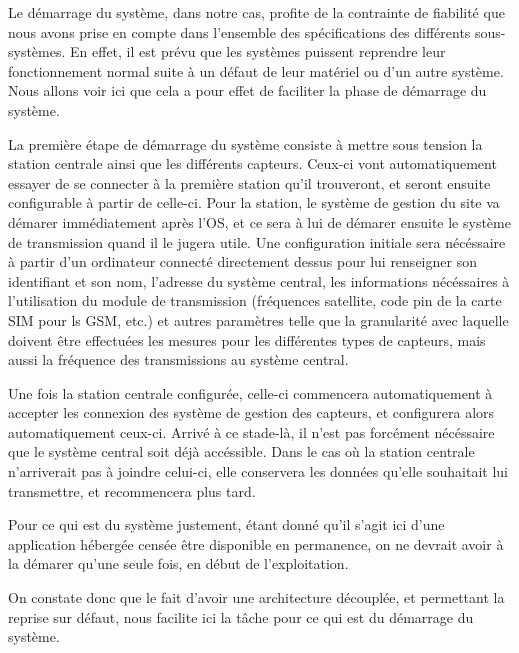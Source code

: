 Le démarrage du système, dans notre cas, profite de la contrainte de fiabilité que nous avons prise en compte dans l'ensemble des spécifications des différents sous-systèmes. En effet, il est prévu que les systèmes puissent reprendre leur fonctionnement normal suite à un défaut de leur matériel ou d'un autre système. Nous allons voir ici que cela a pour effet de faciliter la phase de démarrage du système.

La première étape de démarrage du système consiste à mettre sous tension la station centrale ainsi que les différents capteurs. Ceux-ci vont automatiquement essayer de se connecter à la première station qu'il trouveront, et seront ensuite configurable à partir de celle-ci. Pour la station, le système de gestion du site va démarer immédiatement après l'OS, et ce sera à lui de démarer ensuite le système de transmission quand il le jugera utile. Une configuration initiale sera nécéssaire à partir d'un ordinateur connecté directement dessus pour lui renseigner son identifiant et son nom, l'adresse du système central, les informations nécéssaires à l'utilisation du module de transmission (fréquences satellite, code pin de la carte SIM pour ls GSM, etc.) et autres paramètres telle que la granularité avec laquelle doivent être effectuées les mesures pour les différentes types de capteurs, mais aussi la fréquence des transmissions au système central.

Une fois la station centrale configurée, celle-ci commencera automatiquement à accepter les connexion des système de gestion des capteurs, et configurera alors automatiquement ceux-ci. Arrivé à ce stade-là, il n'est pas forcément nécéssaire que le système central soit déjà accéssible. Dans le cas où la station centrale n'arriverait pas à joindre celui-ci, elle conservera les données qu'elle souhaitait lui transmettre, et recommencera plus tard.

Pour ce qui est du système justement, étant donné qu'il s'agit ici d'une application hébergée censée être disponible en permanence, on ne devrait avoir à la démarer qu'une seule fois, en début de l'exploitation.

On constate donc que le fait d'avoir une architecture découplée, et permettant la reprise sur défaut, nous facilite ici la tâche pour ce qui est du démarrage du système.